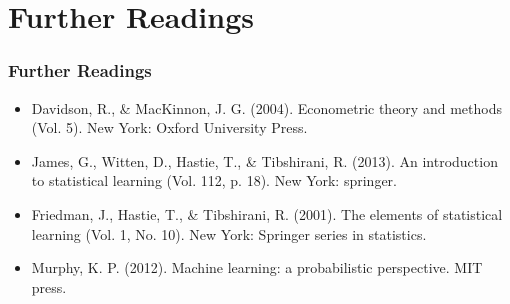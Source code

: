 \documentclass[
  shownotes,
  xcolor={svgnames},
  hyperref={colorlinks,citecolor=DarkBlue,linkcolor=DarkRed,urlcolor=DarkBlue}
  ]{beamer}
\begin{document}
\section{Further Readings}
\begin{frame}
\frametitle{Further Readings}

\begin{itemize}
  \item Davidson, R., \& MacKinnon, J. G. (2004). Econometric theory and methods (Vol. 5). New York: Oxford University Press.
  \bigskip
  \item James, G., Witten, D., Hastie, T., \& Tibshirani, R. (2013). An introduction to statistical learning (Vol. 112, p. 18). New York: springer.
  \bigskip
  \item Friedman, J., Hastie, T., \& Tibshirani, R. (2001). The elements of statistical learning (Vol. 1, No. 10). New York: Springer series in statistics.
  \bigskip
  \item Murphy, K. P. (2012). Machine learning: a probabilistic perspective. MIT press.

\end{itemize}

\end{frame}
\end{document}
